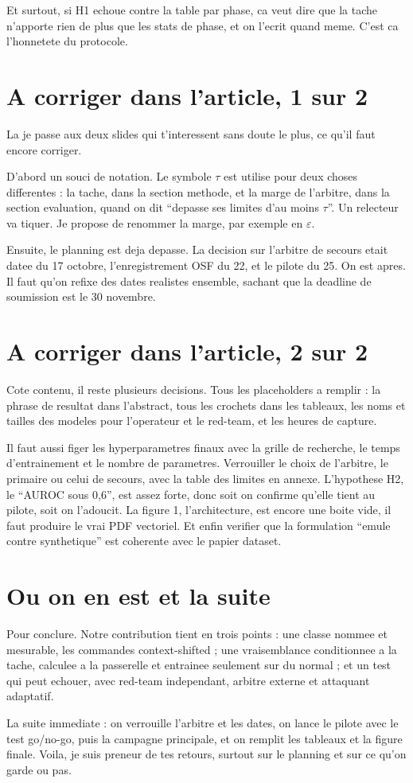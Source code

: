 \documentclass[11pt]{article}
\begin{document}
Et surtout, si H1 echoue contre la table par phase, ca veut dire que la tache
n'apporte rien de plus que les stats de phase, et on l'ecrit quand meme. C'est ca
l'honnetete du protocole.

\section{A corriger dans l'article, 1 sur 2}
La je passe aux deux slides qui t'interessent sans doute le plus, ce qu'il faut
encore corriger.

D'abord un souci de notation. Le symbole \(\tau\) est utilise pour deux choses
differentes : la tache, dans la section methode, et la marge de l'arbitre, dans la
section evaluation, quand on dit ``depasse ses limites d'au moins \(\tau\)''. Un
relecteur va tiquer. Je propose de renommer la marge, par exemple en
\(\varepsilon\).

Ensuite, le planning est deja depasse. La decision sur l'arbitre de secours etait
datee du 17 octobre, l'enregistrement OSF du 22, et le pilote du 25. On est apres.
Il faut qu'on refixe des dates realistes ensemble, sachant que la deadline de soumission
est le 30 novembre.

\section{A corriger dans l'article, 2 sur 2}
Cote contenu, il reste plusieurs decisions. Tous les placeholders a remplir : la
phrase de resultat dans l'abstract, tous les crochets dans les tableaux, les noms et
tailles des modeles pour l'operateur et le red-team, et les heures de capture.

Il faut aussi figer les hyperparametres finaux avec la grille de recherche, le temps
d'entrainement et le nombre de parametres. Verrouiller le choix de l'arbitre, le
primaire ou celui de secours, avec la table des limites en annexe. L'hypothese H2,
le ``AUROC sous 0,6'', est assez forte, donc soit on confirme qu'elle tient au
pilote, soit on l'adoucit. La figure 1, l'architecture, est encore une boite vide,
il faut produire le vrai PDF vectoriel. Et enfin verifier que la formulation ``emule
contre synthetique'' est coherente avec le papier dataset.

\section{Ou on en est et la suite}
Pour conclure. Notre contribution tient en trois points : une classe nommee et
mesurable, les commandes context-shifted ; une vraisemblance conditionnee a la
tache, calculee a la passerelle et entrainee seulement sur du normal ; et un test
qui peut echouer, avec red-team independant, arbitre externe et attaquant adaptatif.

La suite immediate : on verrouille l'arbitre et les dates, on lance le pilote avec
le test go/no-go, puis la campagne principale, et on remplit les tableaux et la
figure finale. Voila, je suis preneur de tes retours, surtout sur le planning et sur
ce qu'on garde ou pas.
\end{document}
